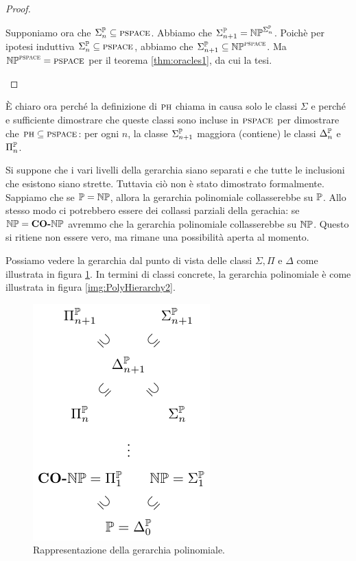 \begin{proof}
\begin{itemize}
            Supponiamo ora che $\Sigma_{n}^{\mathbb{P}} \subseteq \textsc{pspace}$. Abbiamo che $\Sigma_{n+1}^{\mathbb{P}} =
            \mathbb{NP}^{\Sigma_{n}^{\mathbb{P}}}$. Poichè per ipotesi induttiva $\Sigma_{n}^{\mathbb{P}} \subseteq
            \textsc{pspace}$, abbiamo che $\Sigma_{n+1}^{\mathbb{P}} \subseteq \mathbb{NP}^{\textsc{pspace}}$. Ma
            $\mathbb{NP}^{\textsc{pspace}} =
            \textsc{pspace}$ per il teorema \ref{thm:oracles1}, da cui la tesi.
    \end{itemize}
\end{proof}

È chiaro ora perché la definizione di $\textsc{ph}$ chiama in causa solo le classi $\Sigma$ e perché e
sufficiente dimostrare che queste classi sono incluse in $\textsc{pspace}$ per dimostrare che $\textsc{ph} \subseteq
\textsc{pspace}$: per ogni $n$, la classe $\Sigma_{n+1}^{\mathbb{P}}$ maggiora (contiene) le classi $\Delta_{n}^{\mathbb{P}}$
e $\Pi_{n}^{\mathbb{P}}$.

Si suppone che i vari livelli della gerarchia siano separati e che tutte le inclusioni che esistono
siano strette. Tuttavia ciò non è stato dimostrato formalmente. Sappiamo che se $\mathbb{P} =
\mathbb{NP}$, allora la gerarchia polinomiale collasserebbe su $\mathbb{P}$. Allo stesso modo ci
potrebbero essere dei collassi parziali della gerachia: se $\mathbb{NP}=\textbf{CO-}\mathbb{NP}$ avremmo che la gerarchia
polinomiale collasserebbe su $\mathbb{NP}$. Questo si ritiene non essere vero, ma rimane una
possibilità aperta al momento.

Possiamo vedere la gerarchia dal punto di vista delle classi $\Sigma,\Pi$ e $\Delta$ come illustrata
in figura \ref{img:PolyHierarchy1}. In termini di classi concrete, la gerarchia polinomiale è come
illustrata in figura \ref{img:PolyHierarchy2}.

\begin{figure}[h]
    \begin{center}
        \includegraphics{./img/oracles/PolyHierarchy1.pdf}
        \caption{Rappresentazione della gerarchia polinomiale.}
        \label{img:PolyHierarchy1}
    \end{center}
\end{figure}

